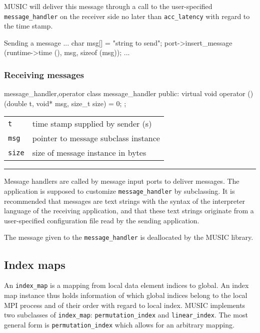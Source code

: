 \documentclass[a4paper,twoside]{report}
\makeatletter
\newenvironment{parameters}%
{\begin{tabular}{@{\hspace{2em}}lp{0.6\textwidth}}}%
{\end{tabular}\par\vspace{1mm}\par\hrule\par\vspace{5mm}}
\makeatother
\begin{document}
MUSIC will deliver this message through a call to the user-specified
\lstinline|message_handler| on the receiver side no later than
\lstinline|acc_latency| with regard to the time stamp.

\begin{code}{Sending a message}
{
  ...
  char msg[] = "string to send";
  port->insert_message (runtime->time (), msg, sizeof (msg));
  ...
}
\end{code}


\subsubsection{Receiving messages}

\begin{head}{message_handler,operator}
  class message_handler {
  public:
    virtual void operator () (double t,
                              void* msg,
                              size_t size) = 0;
  };
\end{head}
\begin{parameters}
  \lstinline|t| & time stamp supplied by sender (s) \\
  \lstinline|msg| & pointer to message subclass instance \\
  \lstinline|size| & size of message instance in bytes \\
\end{parameters}

Message handlers are called by message input ports to deliver
messages.  The application is supposed to customize
\lstinline|message_handler| by subclassing.  It is recommended that
messages are text strings with the syntax of the interpreter language
of the receiving application, and that these text strings originate
from a user-specified configuration file read by the sending
application.

The message given to the \lstinline|message_handler| is deallocated by
the MUSIC library.


\subsection{Index maps}

An \lstinline|index_map| is a mapping from local data element indices to
global. An index map instance thus holds information of which global
indices belong to the local MPI process and of their order with regard
to local index.  MUSIC implements two subclasses of
\lstinline|index_map|: \lstinline|permutation_index| and
\lstinline|linear_index|.  The most general form is
\lstinline|permutation_index| which allows for an arbitrary mapping.
\end{document}
